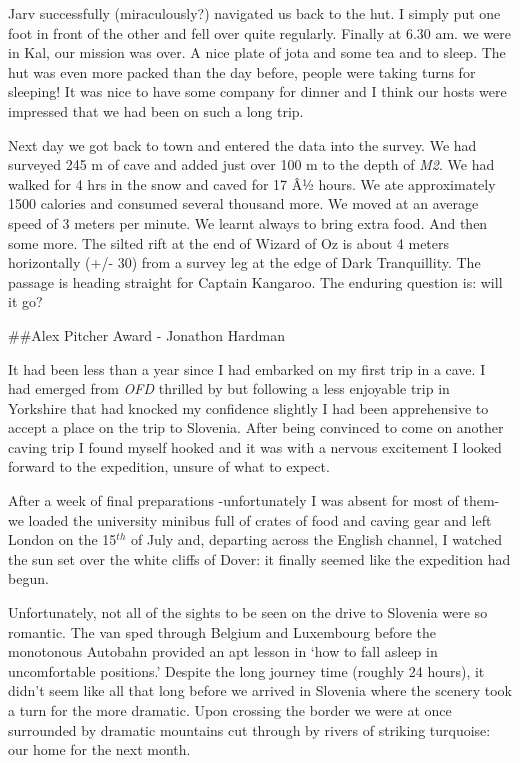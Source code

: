 Jarv successfully (miraculously?) navigated us back to the hut. I simply
put one foot in front of the other and fell over quite regularly.
Finally at 6.30 am. we were in Kal, our mission was over. A nice plate
of jota and some tea and to sleep. The hut was even more packed than the
day before, people were taking turns for sleeping! It was nice to have
some company for dinner and I think our hosts were impressed that we had
been on such a long trip.

Next day we got back to town and entered the data into the survey. We
had surveyed 245 m of cave and added just over 100 m to the depth of
\emph{M2}. We had walked for 4 hrs in the snow and caved for 17 Â½
hours. We ate approximately 1500 calories and consumed several thousand
more. We moved at an average speed of 3 meters per minute. We learnt
always to bring extra food. And then some more. The silted rift at the
end of Wizard of Oz is about 4 meters horizontally (+/- 30) from a
survey leg at the edge of Dark Tranquillity. The passage is heading
straight for Captain Kangaroo. The enduring question is: will it go?


\#\#Alex Pitcher Award - Jonathon Hardman

It had been less than a year since I had embarked on my first trip in a
cave. I had emerged from \emph{OFD}
 thrilled
by but following a less enjoyable trip in Yorkshire that had knocked my
confidence slightly I had been apprehensive to accept a place on the
trip to Slovenia. After being convinced to come on another caving trip I
found myself hooked and it was with a nervous excitement I looked
forward to the expedition, unsure of what to expect.

After a week of final preparations -unfortunately I was absent for most
of them- we loaded the university minibus full of crates of food and
caving gear and left London on the 15\(^{th}\) of July and, departing
across the English channel, I watched the sun set over the white cliffs
of Dover: it finally seemed like the expedition had begun.

Unfortunately, not all of the sights to be seen on the drive to Slovenia
were so romantic. The van sped through Belgium and Luxembourg before the
monotonous Autobahn provided an apt lesson in `how to fall asleep in
uncomfortable positions.' Despite the long journey time (roughly 24
hours), it didn't seem like all that long before we arrived in Slovenia
where the scenery took a turn for the more dramatic. Upon crossing the
border we were at once surrounded by dramatic mountains cut through by
rivers of striking turquoise: our home for the next month.

